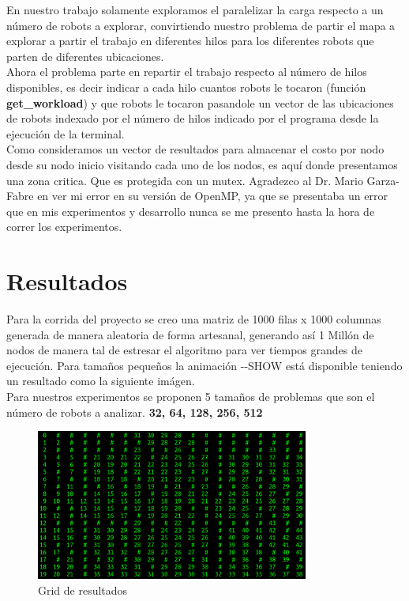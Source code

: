 \documentclass[oneside,twocolumn]{article}
\begin{document}
En nuestro trabajo solamente exploramos el paralelizar la carga respecto a un número de robots a explorar, convirtiendo nuestro problema de partir el mapa a explorar a partir el trabajo en diferentes hilos para los diferentes robots que parten de diferentes ubicaciones.\\

Ahora el problema parte en repartir el trabajo respecto al número de hilos disponibles, es decir indicar a cada hilo cuantos robots le tocaron (función \textbf{get\_workload}) y que robots le tocaron pasandole un vector de las ubicaciones de robots indexado por el número de hilos indicado por el programa desde la ejecución de la terminal.\\

Como consideramos un vector de resultados para almacenar el costo por nodo desde su nodo inicio visitando cada uno de los nodos, es aquí donde presentamos una zona critica. Que es protegida con un mutex. Agradezco al Dr. Mario Garza-Fabre en ver mi error en su versión de OpenMP, ya que se presentaba un error que en mis experimentos y desarrollo nunca se me presento hasta la hora de correr los experimentos.

\newpage
\onecolumn
\section{Resultados}

Para la corrida del proyecto se creo una matriz de 1000 filas x 1000 columnas generada de manera aleatoria de forma artesanal, generando así 1 Millón de nodos de manera tal de estresar el algoritmo para ver tiempos grandes de ejecución. Para tamaños pequeños la animación -{}-SHOW está disponible teniendo un resultado como la siguiente imágen.\\

Para nuestros experimentos se proponen 5 tamaños de problemas que son el número de robots a analizar. \textbf{32, 64, 128, 256, 512}\\

\begin{figure}[h]
    \centering
    \includegraphics[width=0.80\textwidth]{grid.png}
    \caption{Grid de resultados}
    \label{fig:grid_resultados}
\end{figure}
\end{document}
